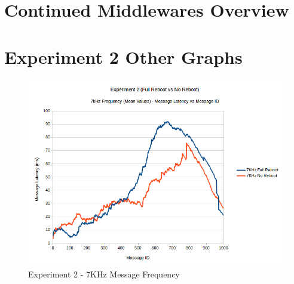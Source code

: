 \documentclass{l4proj}
\begin{document}














\begin{appendices}

\chapter{Continued Middlewares Overview}
\label{middlewares-overview-appendix}


\chapter{Experiment 2 Other Graphs}
\label{exp2-appendix-results}

\begin{figure}
\centering
\includegraphics[width=\textwidth]{images/experiment2/7khz-mean.png}
\caption{Experiment 2 - 7KHz Message Frequency}
\label{exp2-7khz}
\end{figure}


\end{appendices}
\end{document}
